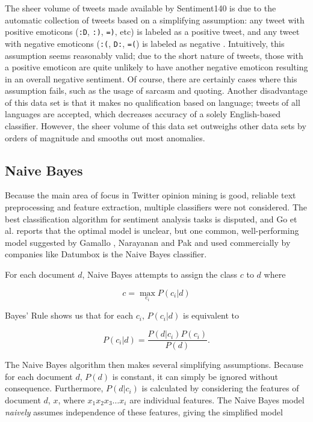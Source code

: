 \documentclass[letter,12pt]{article}
\begin{document}
The sheer volume of tweets made available by Sentiment140 is due to the
automatic collection of tweets based on a simplifying assumption: any tweet
with positive emoticons (\texttt{:D}, \texttt{:)}, \texttt{=)}, etc) is labeled
as a positive tweet, and any tweet with negative emoticons (\texttt{:(},
\texttt{D:}, \texttt{=(}) is labeled as negative \cite{go09}. Intuitively, this
assumption seems reasonably valid; due to the short nature of tweets, those
with a positive emoticon are quite unlikely to have another negative emoticon
resulting in an overall negative sentiment. Of course, there are certainly
cases where this assumption fails, such as the usage of sarcasm and quoting.
Another disadvantage of this data set is that it makes no qualification based
on language; tweets of all languages are accepted, which decreases accuracy of
a solely English-based classifier. However, the sheer volume of this data set
outweighs other data sets by orders of magnitude and smooths out most anomalies.

\subsection{Naive Bayes}

Because the main area of focus in Twitter opinion
mining is good, reliable text preprocessing and feature extraction, multiple
classifiers were not considered. The best classification algorithm for
sentiment analysis tasks is disputed, and Go et al. \cite{go09} reports that
the optimal model is unclear, but one common, well-performing model suggested
by Gamallo \cite{gamallo14}, Narayanan \cite{narayanan13} and Pak \cite{pak10}
and used commercially by companies like Datumbox is the Naive Bayes classifier.

For each document $d$, Naive Bayes attempts to assign the class $c$ to $d$
where

\begin{equation}
  c = \max_{c_i} P(c_i | d)
\end{equation}

Bayes' Rule shows us that for each $c_i$, $P(c_i | d)$ is equivalent to

\begin{equation}
  P(c_i|d) = \frac{P(d | c_i)P(c_i)}{P(d)}.
\end{equation}

The Naive Bayes algorithm then makes several simplifying assumptions. Because
for each document $d$, $P(d)$ is constant, it can simply be ignored without
consequence. Furthermore, $P(d | c_i)$ is calculated by considering the
features of document $d$, $x$, where $x_1 x_2 x_3\dots x_i$ are individual
features. The Naive Bayes model \emph{naively} assumes independence of these
features, giving the simplified model
\end{document}
